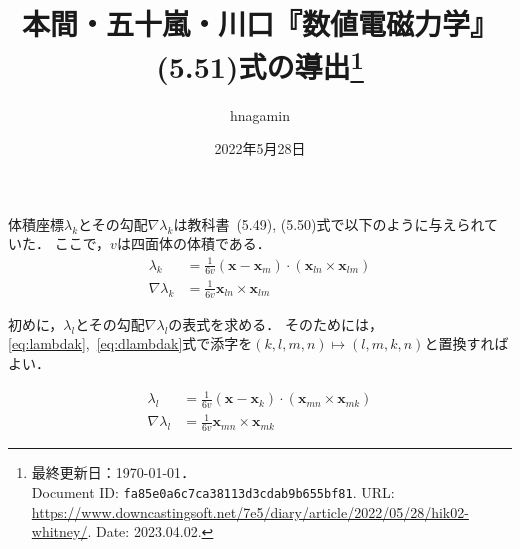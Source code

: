 \documentclass{jlreq}
\begin{document}
\title{本間・五十嵐・川口『数値電磁力学』 (5.51)式の導出\thanks{%
  最終更新日：{\today}．\\
  Document ID: \texttt{fa85e0a6c7ca38113d3cdab9b655bf81}.
  URL: \url{https://www.downcastingsoft.net/7e5/diary/article/2022/05/28/hik02-whitney/}.
  Date: 2023.04.02.
}}
\author{hnagamin}
\date{2022年5月28日}
\maketitle

体積座標\(\lambda_k\)とその勾配\(\nabla\lambda_k\)は教科書~(5.49), (5.50)式で以下のように与えられていた\cite[p. 159]{Homma2002}．
ここで，\(v\)は四面体の体積である．
\begin{align}
  \lambda_k
  &= \frac{1}{6v}(\bm{x}-\bm{x}_m)\cdot(\bm{x}_{l n}\times\bm{x}_{lm})
  \label{eq:lambdak} \\
  \nabla \lambda_k
  &= \frac{1}{6v}\bm{x}_{l n}\times\bm{x}_{lm}
  \label{eq:dlambdak}
\end{align}

初めに，\(\lambda_l\)とその勾配\(\nabla\lambda_l\)の表式を求める．
そのためには，\eqref{eq:lambdak},~\eqref{eq:dlambdak}式で添字を\(
  (k,l,m,n)\mapsto(l,m,k,n)
\)と置換すればよい．

\begin{align}
  \lambda_l
  &= \frac{1}{6v}(\bm{x}-\bm{x}_k)\cdot(\bm{x}_{mn}\times\bm{x}_{mk})
  \label{eq:lambdal} \\
  \nabla\lambda_l
  &= \frac{1}{6v}\bm{x}_{mn}\times\bm{x}_{mk}
  \label{eq:dlambdal}
\end{align}
\end{document}
